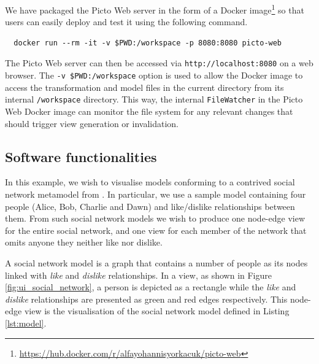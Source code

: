 \documentclass[preprint,12pt, a4paper]{elsarticle}
\begin{document}
We have packaged the Picto Web server in the form of a Docker image\footnote{\url{https://hub.docker.com/r/alfayohannisyorkacuk/picto-web}} so that users can easily deploy and test it using the following command. 

\begin{verbatim}
  docker run --rm -it -v $PWD:/workspace -p 8080:8080 picto-web
\end{verbatim}

The Picto Web server can then be accessed via \texttt{http://localhost:8080} on a web browser. 
The \texttt{-v \$PWD:/workspace} option is used to allow the Docker image to access the transformation and model files in the current directory from its internal \texttt{/workspace} directory. 
This way, the internal \texttt{FileWatcher} in the Picto Web Docker image can monitor the file system for any relevant changes that should trigger view generation or invalidation.

\subsection{Software functionalities}

In this example, we wish to visualise models conforming to a contrived social network metamodel from \cite{dimitris2020picto}. In particular, we use a sample model containing four people (Alice, Bob,  Charlie and Dawn) and like/dislike relationships between them. From such social network models we wish to produce one node-edge view for the entire social network, and one view for each member of the network that omits anyone they neither like nor dislike.

A social network model is a graph that contains a number of people as its nodes linked with \emph{like} and \emph{dislike} relationships. In a view, as shown in Figure \ref{fig:ui_social_network}, a person is depicted as a rectangle while the \emph{like} and \emph{dislike} relationships are presented as green and red edges respectively. This node-edge view is the visualisation of the social network model defined in Listing \ref{lst:model}.
\end{document}

